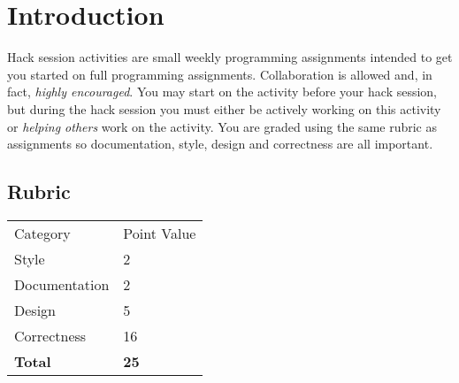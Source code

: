 \section*{Introduction}

Hack session activities are small weekly programming assignments intended
to get you started on full programming assignments.  Collaboration is allowed
and, in fact, \emph{highly encouraged}.  You may start on the activity before
your hack session, but during the hack session you must either be actively 
working on this activity or \emph{helping others} work on the activity.
You are graded using the same rubric as assignments so documentation, style, 
design and correctness are all important.

\subsection*{Rubric}
\begin{table}[H]
\begin{tabular}{ll}
Category       & Point Value \\
Style          & 2           \\
Documentation  & 2           \\
Design         & 5           \\
Correctness    & 16          \\
\textbf{Total} & \textbf{25}
\end{tabular}
\end{table}

